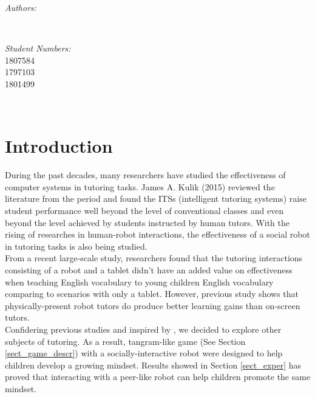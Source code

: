 \documentclass[12pt]{article}
\makeatletter
\newcommand{\studentnumber}{1807584 \\ 1797103 \\ 1801499}
\let\theauthor\@author
\makeatother
\begin{document}
\begin{titlepage}
        \begin{minipage}{0.4\textwidth}
               \begin{flushleft} \large
                       \emph{Authors:}\\
                       \theauthor
                       \end{flushleft}
                       \end{minipage}~
                       \begin{minipage}{0.4\textwidth}
                       \begin{flushright} \large
                       \emph{Student Numbers:} \\
                       \studentnumber
               \end{flushright}
        \end{minipage}\\[2 cm]
 
 
        \vfill
 
\end{titlepage}
 
 
\tableofcontents
\pagebreak
 
 
\pagebreak
 
\section{Introduction}
During the past decades, many researchers have studied the effectiveness of computer systems in tutoring tasks. James A. Kulik (2015)\cite{0034654315581420} reviewed the literature from the period and found the ITSs (intelligent tutoring systems) raise student performance well beyond the level of conventional classes and even beyond the level achieved by students instructed by human tutors. With the rising of researches in human-robot interactions, the effectiveness of a social robot in tutoring tasks is also being studied. 
\\
From a recent large-scale study\cite{8673077}, researchers found that the tutoring interactions consisting of a robot and a tablet didn't have an added value on effectiveness when teaching English vocabulary to young children English vocabulary comparing to scenarios with only a tablet. However, previous study shows that physically-present robot tutors do produce better learning gains than on-screen tutors\cite{Leyzberg_thephysical}. 
\\
Confidering previous studies and inspired by \cite{Park:2017:GGM:2909824.3020213}, we decided to explore other subjects of tutoring. As a result, tangram-like game (See Section \ref{sect_game_descr}) with a socially-interactive robot were designed to help children develop a growing mindset. Results showed in Section \ref{sect_exper} has proved that  interacting with a peer-like robot can help children promote the same mindset. 
 
\end{document}
